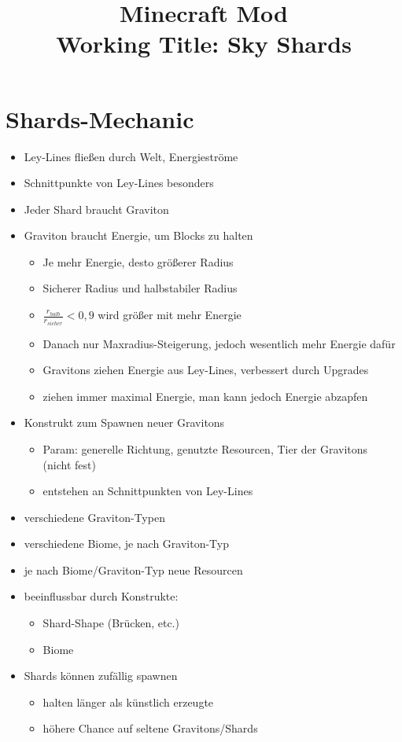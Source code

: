 \documentclass[]{article}
\title{Minecraft Mod\\
	Working Title: Sky Shards}
\author{}
\begin{document}
\maketitle

\begin{abstract}

\end{abstract}

\section{Shards-Mechanic}
\begin{itemize}
	\item Ley-Lines fließen durch Welt, Energieströme
	\item Schnittpunkte von Ley-Lines besonders
	\item Jeder Shard braucht Graviton
	\item Graviton braucht Energie, um Blocks zu halten
	\begin{itemize}
		\item Je mehr Energie, desto größerer Radius
		\item Sicherer Radius und halbstabiler Radius
		\item $\frac{r_{halb}}{r_{sicher}} < 0,9$ wird größer mit mehr Energie
		\item Danach nur Maxradius-Steigerung, jedoch wesentlich mehr Energie dafür
		\item Gravitons ziehen Energie aus Ley-Lines, verbessert durch Upgrades
		\item ziehen immer maximal Energie, man kann jedoch Energie abzapfen
	\end{itemize}
	\item Konstrukt zum Spawnen neuer Gravitons
	\begin{itemize}
		\item Param: generelle Richtung, genutzte Resourcen, Tier der Gravitons \\(nicht fest)
		\item entstehen an Schnittpunkten von Ley-Lines
	\end{itemize}
	\item verschiedene Graviton-Typen
	\item verschiedene Biome, je nach Graviton-Typ
	\item je nach Biome/Graviton-Typ neue Resourcen
	\item beeinflussbar durch Konstrukte:
	\begin{itemize}
		\item Shard-Shape (Brücken, etc.)
		\item Biome
	\end{itemize}
	\item Shards können zufällig spawnen
	\begin{itemize}
		\item halten länger als künstlich erzeugte
		\item höhere Chance auf seltene Gravitons/Shards
	\end{itemize}
\end{itemize}
\end{document}
